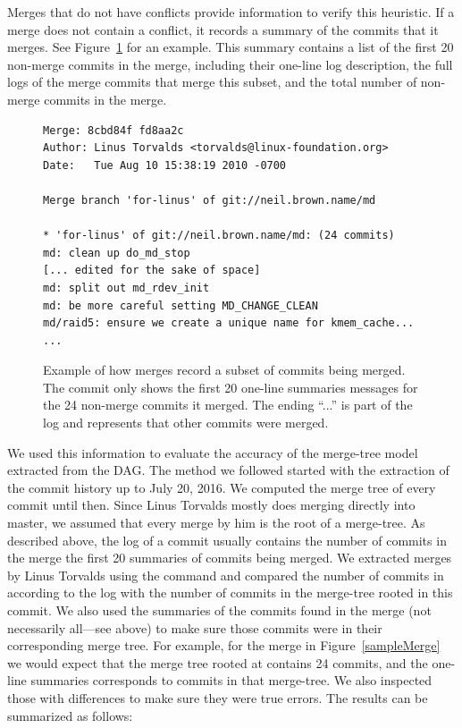 \documentclass[conference, draftclsnofoot, draft]{IEEEtran}
\begin{document}
Merges that do not have conflicts provide information to verify this heuristic. If a
merge does not contain a conflict, it records a summary of the commits that it
merges. See Figure~\ref{fig:sampleMerge} for an example. This summary contains a
list of the first 20 non-merge commits in the merge, including their one-line log
description, the full logs of the merge commits that merge this subset, and the
total number of non-merge commits in the merge.

\begin{figure}[htbp]
        \centering
        {\fontsize{7}{9}
        \begin{verbatim}
Merge: 8cbd84f fd8aa2c
Author: Linus Torvalds <torvalds@linux-foundation.org>
Date:   Tue Aug 10 15:38:19 2010 -0700

Merge branch 'for-linus' of git://neil.brown.name/md

* 'for-linus' of git://neil.brown.name/md: (24 commits)
md: clean up do_md_stop
[... edited for the sake of space]
md: split out md_rdev_init
md: be more careful setting MD_CHANGE_CLEAN
md/raid5: ensure we create a unique name for kmem_cache...
...
        \end{verbatim}}\vspace{-5mm}
        \caption{Example of how merges record a subset of commits being merged. The
                commit only shows the first 20 one-line summaries messages for the 24
                non-merge commits it merged. The ending ``...'' is part of the log
                and represents that other commits were merged.}
        \label{fig:sampleMerge}
\end{figure}



We used this information to evaluate the accuracy of the merge-tree model extracted from the DAG. The method we followed
started with the extraction of the commit history up to July 20, 2016. We computed the merge tree of every commit until
then. Since Linus Torvalds mostly does merging directly into master, we assumed that every merge by him is the root of a
merge-tree. As described above, the log of a commit usually contains the number of commits in the merge the first 20
summaries of commits being merged. We extracted merges by Linus Torvalds using the command  and compared
the number of commits in according to the log with the number of commits in the  merge-tree rooted in this commit. We
also used the summaries of the commits found in the merge (not necessarily all---see above) to make sure those 
commits were in their corresponding merge tree. For example, for the merge in Figure~\ref{sampleMerge} we would expect
that the merge tree rooted at  contains 24 commits, and the one-line summaries corresponds to commits in
that merge-tree. We also inspected those with differences to make sure they were true errors.
The results can be summarized as follows:
\end{document}
